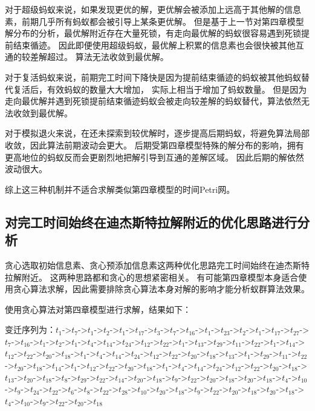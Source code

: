 对于超级蚂蚁来说，如果发现更优的解，更优解会被添加上远高于其他解的信息素，前期几乎所有蚂蚁都会被引导上某条更优解。
但是基于上一节对第四章模型解分布的分析，最优解附近存在大量死锁，有走向最优解的蚂蚁很容易遇到死锁提前结束循迹。
因此即便使用超级蚂蚁，最优解上积累的信息素也会很快被其他互通的较差解超过。
算法无法收敛到最优解。

对于复活蚂蚁来说，前期完工时间下降快是因为提前结束循迹的蚂蚁被其他蚂蚁替代复活后，有效蚂蚁的数量大大增加，
实际上相当于增加了蚂蚁数量。
但是因为走向最优解并遇到死锁提前结束循迹蚂蚁会被走向较差解的蚂蚁替代，算法依然无法收敛到最优解。

对于模拟退火来说，在还未探索到较优解时，逐步提高后期蚂蚁，将避免算法局部收敛，因此算法前期波动会更大。
后期受第四章模型特殊的解分布的影响，拥有更高地位的蚂蚁反而会更剧烈地把解引导到互通的差解区域。
因此后期的解依然波动很大。

综上这三种机制并不适合求解类似第四章模型的时间Petri网。

\subsection{对完工时间始终在迪杰斯特拉解附近的优化思路进行分析}
贪心选取初始信息素、贪心预添加信息素这两种优化思路完工时间始终在迪杰斯特拉解附近。
这两种思路都和贪心的思想紧密相关。
有可能第四章模型本身适合使用贪心算法求解，因此需要排除贪心算法本身对解的影响才能分析蚁群算法效果。

使用贪心算法对第四章模型进行求解，结果如下：

变迁序列为：$t_{1}$->$t_{7}$->$t_{1}$->$t_{2}$->$t_{1}$->$t_{17}$->$t_{3}$->$t_{7}$->$t_{16}$->$t_{1}$->$t_{23}$->$t_{2}$->$t_{1}$->$t_{17}$->$t_{27}$->$t_{7}$->$t_{16}$->$t_{1}$->$t_{2}$->$t_{1}$->$t_{4}$->$t_{14}$->$t_{24}$->$t_{12}$->$t_{22}$->$t_{1}$->$t_{13}$->$t_{29}$->$t_{11}$->$t_{22}$->$t_{1}$->$t_{14}$->$t_{12}$->$t_{22}$->$t_{20}$->$t_{18}$->$t_{1}$->$t_{4}$->$t_{14}$->$t_{24}$->$t_{12}$->$t_{22}$->$t_{20}$->$t_{18}$->$t_{13}$->$t_{1}$->$t_{29}$->$t_{11}$->$t_{22}$->$t_{20}$->$t_{18}$->$t_{14}$->$t_{1}$->$t_{12}$->$t_{22}$->$t_{20}$->$t_{18}$->$t_{1}$->$t_{4}$->$t_{14}$->$t_{24}$->$t_{12}$->$t_{22}$->$t_{20}$->$t_{18}$->$t_{13}$->$t_{20}$->$t_{18}$->$t_{8}$->$t_{29}$->$t_{22}$->$t_{14}$->$t_{20}$->$t_{18}$->$t_{9}$->$t_{22}$->$t_{20}$->$t_{18}$->$t_{20}$->$t_{18}$->$t_{4}$->$t_{10}$->$t_{9}$->$t_{24}$->$t_{22}$->$t_{6}$->$t_{8}$->$t_{22}$->$t_{28}$->$t_{10}$->$t_{20}$->$t_{18}$->$t_{9}$->$t_{22}$->$t_{20}$->$t_{18}$->$t_{20}$->$t_{18}$->$t_{4}$->$t_{10}$->$t_{9}$->$t_{22}$->$t_{20}$->$t_{18}$

